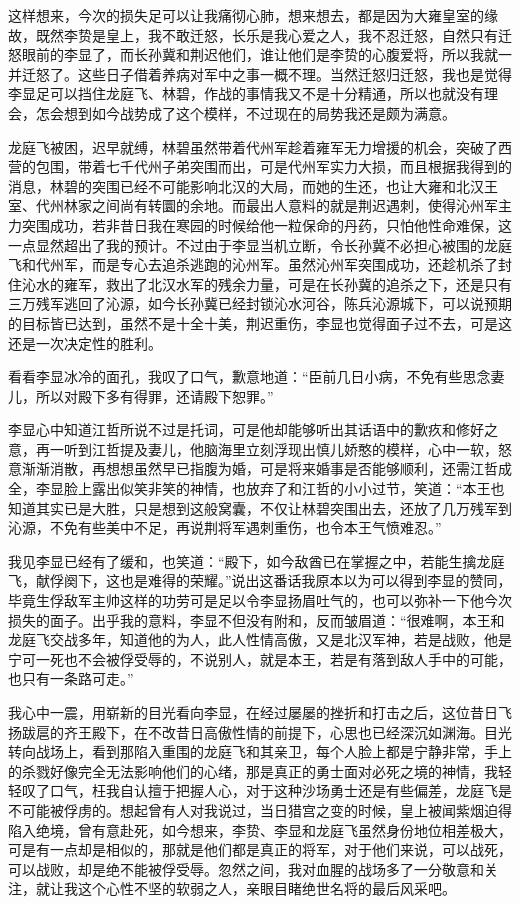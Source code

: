 这样想来，今次的损失足可以让我痛彻心肺，想来想去，都是因为大雍皇室的缘故，既然李贽是皇上，我不敢迁怒，长乐是我心爱之人，我不忍迁怒，自然只有迁怒眼前的李显了，而长孙冀和荆迟他们，谁让他们是李贽的心腹爱将，所以我就一并迁怒了。这些日子借着养病对军中之事一概不理。当然迁怒归迁怒，我也是觉得李显足可以挡住龙庭飞、林碧，作战的事情我又不是十分精通，所以也就没有理会，怎会想到如今战势成了这个模样，不过现在的局势我还是颇为满意。

龙庭飞被困，迟早就缚，林碧虽然带着代州军趁着雍军无力增援的机会，突破了西营的包围，带着七千代州子弟突围而出，可是代州军实力大损，而且根据我得到的消息，林碧的突围已经不可能影响北汉的大局，而她的生还，也让大雍和北汉王室、代州林家之间尚有转圜的余地。而最出人意料的就是荆迟遇刺，使得沁州军主力突围成功，若非昔日我在寒园的时候给他一粒保命的丹药，只怕他性命难保，这一点显然超出了我的预计。不过由于李显当机立断，令长孙冀不必担心被围的龙庭飞和代州军，而是专心去追杀逃跑的沁州军。虽然沁州军突围成功，还趁机杀了封住沁水的雍军，救出了北汉水军的残余力量，可是在长孙冀的追杀之下，还是只有三万残军逃回了沁源，如今长孙冀已经封锁沁水河谷，陈兵沁源城下，可以说预期的目标皆已达到，虽然不是十全十美，荆迟重伤，李显也觉得面子过不去，可是这还是一次决定性的胜利。

看看李显冰冷的面孔，我叹了口气，歉意地道：“臣前几日小病，不免有些思念妻儿，所以对殿下多有得罪，还请殿下恕罪。”

李显心中知道江哲所说不过是托词，可是他却能够听出其话语中的歉疚和修好之意，再一听到江哲提及妻儿，他脑海里立刻浮现出慎儿娇憨的模样，心中一软，怒意渐渐消散，再想想虽然早已指腹为婚，可是将来婚事是否能够顺利，还需江哲成全，李显脸上露出似笑非笑的神情，也放弃了和江哲的小小过节，笑道：“本王也知道其实已是大胜，只是想到这般窝囊，不仅让林碧突围出去，还放了几万残军到沁源，不免有些美中不足，再说荆将军遇刺重伤，也令本王气愤难忍。”

我见李显已经有了缓和，也笑道：“殿下，如今敌酋已在掌握之中，若能生擒龙庭飞，献俘阕下，这也是难得的荣耀。”说出这番话我原本以为可以得到李显的赞同，毕竟生俘敌军主帅这样的功劳可是足以令李显扬眉吐气的，也可以弥补一下他今次损失的面子。出乎我的意料，李显不但没有附和，反而皱眉道：“很难啊，本王和龙庭飞交战多年，知道他的为人，此人性情高傲，又是北汉军神，若是战败，他是宁可一死也不会被俘受辱的，不说别人，就是本王，若是有落到敌人手中的可能，也只有一条路可走。”

我心中一震，用崭新的目光看向李显，在经过屡屡的挫折和打击之后，这位昔日飞扬跋扈的齐王殿下，在不改昔日高傲性情的前提下，心思也已经深沉如渊海。目光转向战场上，看到那陷入重围的龙庭飞和其亲卫，每个人脸上都是宁静非常，手上的杀戮好像完全无法影响他们的心绪，那是真正的勇士面对必死之境的神情，我轻轻叹了口气，枉我自认擅于把握人心，对于这种沙场勇士还是有些偏差，龙庭飞是不可能被俘虏的。想起曾有人对我说过，当日猎宫之变的时候，皇上被闻紫烟迫得陷入绝境，曾有意赴死，如今想来，李贽、李显和龙庭飞虽然身份地位相差极大，可是有一点却是相似的，那就是他们都是真正的将军，对于他们来说，可以战死，可以战败，却是绝不能被俘受辱。忽然之间，我对血腥的战场多了一分敬意和关注，就让我这个心性不坚的软弱之人，亲眼目睹绝世名将的最后风采吧。

